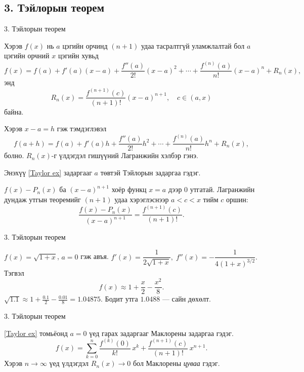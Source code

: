 \subsection*{3. Тэйлорын теорем}
\begin{frame}[allowframebreaks]{3. Тэйлорын теорем}
\begin{theorem}[Тэйлор]
Хэрэв $f(x)$ нь $a$ цэгийн орчинд $(n+1)$ удаа тасралтгүй уламжлалтай бол $a$ цэгийн орчний $x$ цэгийн хувьд
\begin{equation}\label{Taylor ex}
    f(x)=f(a)+f'(a)(x-a)+\frac{f''(a)}{2!}(x-a)^2+\cdots+\frac{f^{(n)}(a)}{n!}(x-a)^n+R_n(x),
\end{equation}
энд 
\[
R_n(x)=\frac{f^{(n+1)}(c)}{(n+1)!}(x-a)^{n+1},\quad c\in(a,x)
\] байна. 

Хэрэв $x-a=h$ гэж тэмдэглэвэл \[
f(a+h)=f(a)+f'(a)h+\frac{f''(a)}{2!}h^2+\cdots+\frac{f^{(n)}(a)}{n!}h^n+R_n(x),
\] болно. $R_n(x)$-г үлдэгдэл гишүүний Лагранжийн хэлбэр гэнэ.

Энэхүү \ref{Taylor ex} задаргааг $a$ төвтэй Тэйлорын задаргаа гэдэг. 
\end{theorem}

\begin{prof}
$f(x)-P_n(x)$ ба $(x-a)^{n+1}$ хоёр функц $x=a$ дээр 0 утгатай.  
Лагранжийн дундаж утгын теоремийг $(n+1)$ удаа хэрэглэснээр
$a<c<x$ тийм $c$ оршин:
\[
\frac{f(x)-P_n(x)}{(x-a)^{n+1}}=\frac{f^{(n+1)}(c)}{(n+1)!}.
\]
\end{prof}
\end{frame}

\begin{frame}[allowframebreaks]{3. Тэйлорын теорем}
\begin{example}
$f(x)=\sqrt{1+x}$, $a=0$ гэж авъя.  
$f'(x)=\dfrac1{2\sqrt{1+x}},\;
f''(x)=-\dfrac1{4(1+x)^{3/2}}.$  
Тэгвэл
\[
f(x)\approx1+\frac{x}{2}-\frac{x^2}{8}.
\]
$\sqrt{1.1}\approx1+\frac{0.1}{2}-\frac{0.01}{8}=1.04875.$  
Бодит утга $1.0488$ — сайн дөхөлт.
\end{example}
\end{frame}

\begin{frame}[allowframebreaks]{3. Тэйлорын теорем}
\begin{remark}
\ref{Taylor ex} томьёонд $a=0$ үед гарах задаргааг Маклорены задаргаа гэдэг. 
\[
f(x)=\sum_{k=0}^{n}\frac{f^{(k)}(0)}{k!}\,x^k+ \frac{f^{(n+1)}(c)}{(n+1)!}\,x^{n+1}.
\]
Хэрэв $n\to\infty$ үед үлдэгдэл $R_{n}(x)\to 0$ бол Маклорены \emph{цуваа} гэдэг.
\end{remark}
\end{frame}

